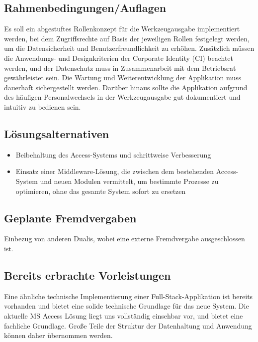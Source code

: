 \documentclass[a4paper, 12pt]{article}
\begin{document}
\vspace{1cm}

\subsection{Rahmenbedingungen/Auflagen}
Es soll ein abgestuftes Rollenkonzept für die Werkzeugausgabe implementiert werden, bei dem Zugriffsrechte auf Basis der jeweiligen Rollen festgelegt werden, um die Datensicherheit und Benutzerfreundlichkeit zu erhöhen. Zusätzlich müssen die Anwendungs- und Designkriterien der Corporate Identity (CI) beachtet werden, und der Datenschutz muss in Zusammenarbeit mit dem Betriebsrat gewährleistet sein. Die Wartung und Weiterentwicklung der Applikation muss dauerhaft sichergestellt werden. Darüber hinaus sollte die Applikation aufgrund des häufigen Personalwechsels in der Werkzeugausgabe gut dokumentiert und intuitiv zu bedienen sein.

\vspace{1cm}
\newpage %

\subsection{Lösungsalternativen}
\begin{itemize}[itemsep=0cm]
    \item Beibehaltung des Access-Systems und schrittweise Verbesserung
    \item Einsatz einer Middleware-Lösung, die zwischen dem bestehenden Access-System und neuen Modulen vermittelt, um bestimmte Prozesse zu optimieren, ohne das gesamte System sofort zu ersetzen
\end{itemize}

\vspace{1cm}

\subsection{Geplante Fremdvergaben}
Einbezug von anderen Dualis, wobei eine externe Fremdvergabe ausgeschlossen ist.

\vspace{1cm}

\subsection{Bereits erbrachte Vorleistungen}
Eine ähnliche technische Implementierung einer Full-Stack-Applikation ist bereits vorhanden und bietet eine solide technische Grundlage für das neue System. Die aktuelle MS Access Lösung liegt uns vollständig einsehbar vor, und bietet eine fachliche Grundlage. Große Teile der Struktur der Datenhaltung und Anwendung können daher übernommen werden.
\end{document}
